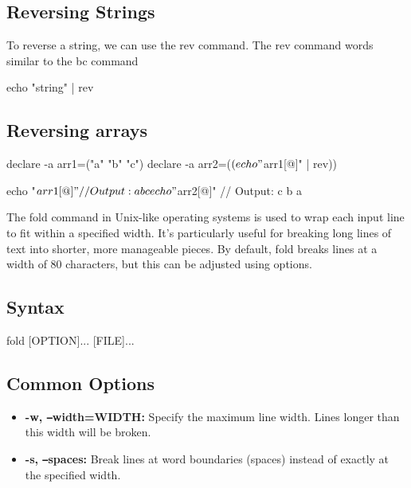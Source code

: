 \documentclass{report}
\begin{document}
    \subsection{Reversing Strings}
    \bigbreak \noindent 
    To reverse a string, we can use the rev command. The rev command words similar to the bc command
    \bigbreak \noindent 
    \begin{bashcode}
        echo "string" | rev
    \end{bashcode}

    \bigbreak \noindent 
    \subsection{Reversing arrays}
    \bigbreak \noindent 
    \begin{bashcode}
        declare -a arr1=("a" "b" "c")
        declare -a arr2=($(echo "${arr1[@]}" | rev))

        echo "${arr1[@]}" // Output: a b c
        echo "${arr2[@]}" // Output: c b a
    \end{bashcode}

    \pagebreak 
    \bigbreak \noindent 
    The fold command in Unix-like operating systems is used to wrap each input line to fit within a specified width. It's particularly useful for breaking long lines of text into shorter, more manageable pieces. By default, fold breaks lines at a width of 80 characters, but this can be adjusted using options.
    \bigbreak \noindent 
    \subsection{Syntax}
    \bigbreak \noindent 
    \begin{bashcode}
        fold [OPTION]... [FILE]...
    \end{bashcode}
    \bigbreak \noindent 
    \subsection{Common Options}
    \begin{itemize}
        \item \textbf{-w, \texttt{--}width=WIDTH:} Specify the maximum line width. Lines longer than this width will be broken.
        \item \textbf{-s, \texttt{--}spaces:} Break lines at word boundaries (spaces) instead of exactly at the specified width.
    \end{itemize}
    \bigbreak \noindent 
\end{document}
